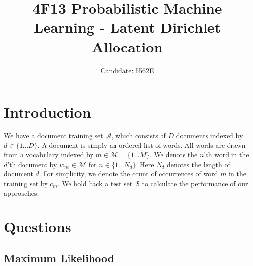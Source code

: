 \documentclass[]{article}
\title{4F13 Probabilistic Machine Learning - Latent Dirichlet Allocation}
\author{Candidate: 5562E}
\newcommand{\Acal}{\mathcal{A}}
\newcommand{\Bcal}{\mathcal{B}}
\newcommand{\Mcal}{\mathcal{M}}
\begin{document}


\setcounter{page}{1}
\maketitle

\tableofcontents

\section{Introduction}

We have a document training set $\Acal$, which consists of $D$ documents indexed by $d \in \{1 \dots D\}$. A document is simply an ordered list of words. All words are drawn from a vocabulary indexed by $m \in \Mcal = \{1 \dots M\}$. We denote the $n$'th word in the $d$'th document by $w_{nd} \in \Mcal$ for $n \in \{1 \dots N_d\}$. Here $N_d$ denotes the length of document $d$. For simplicity, we denote the count of occurrences of word $m$ in the training set by $c_m$. We hold back a test set $\Bcal$ to calculate the performance of our approaches.

\clearpage
\section{Questions}
\subsection{Maximum Likelihood}
\end{document}
